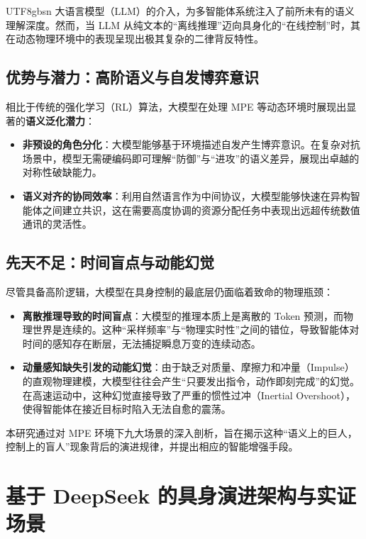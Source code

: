 \documentclass[11pt,a4paper]{article}
\begin{document}
\begin{CJK*}{UTF8}{gbsn}
大语言模型（LLM）的介入，为多智能体系统注入了前所未有的语义理解深度。然而，当 LLM 从纯文本的“离线推理”迈向具身化的“在线控制”时，其在动态物理环境中的表现呈现出极其复杂的二律背反特性。

\subsection{优势与潜力：高阶语义与自发博弈意识}
相比于传统的强化学习（RL）算法，大模型在处理 MPE 等动态环境时展现出显著的\textbf{语义泛化潜力}：
\begin{itemize}
    \item \textbf{非预设的角色分化}：大模型能够基于环境描述自发产生博弈意识。在复杂对抗场景中，模型无需硬编码即可理解“防御”与“进攻”的语义差异，展现出卓越的对称性破缺能力。
    \item \textbf{语义对齐的协同效率}：利用自然语言作为中间协议，大模型能够快速在异构智能体之间建立共识，这在需要高度协调的资源分配任务中表现出远超传统数值通讯的灵活性。
\end{itemize}

\subsection{先天不足：时间盲点与动能幻觉}
尽管具备高阶逻辑，大模型在具身控制的最底层仍面临着致命的物理瓶颈：
\begin{itemize}
    \item \textbf{离散推理导致的时间盲点}：大模型的推理本质上是离散的 Token 预测，而物理世界是连续的。这种“采样频率”与“物理实时性”之间的错位，导致智能体对时间的感知存在断层，无法捕捉瞬息万变的连续动态。
    \item \textbf{动量感知缺失引发的动能幻觉}：由于缺乏对质量、摩擦力和冲量（Impulse）的直观物理建模，大模型往往会产生“只要发出指令，动作即刻完成”的幻觉。在高速运动中，这种幻觉直接导致了严重的惯性过冲（Inertial Overshoot），使得智能体在接近目标时陷入无法自愈的震荡。
\end{itemize}

本研究通过对 MPE 环境下九大场景的深入剖析，旨在揭示这种“语义上的巨人，控制上的盲人”现象背后的演进规律，并提出相应的智能增强手段。

\newpage 

\section{基于 DeepSeek 的具身演进架构与实证场景}


\end{CJK*}
\end{document}
